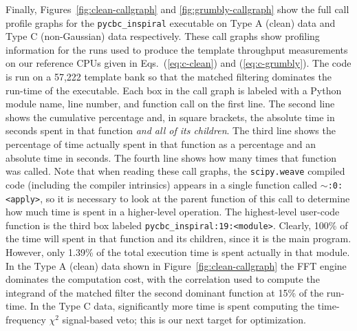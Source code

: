 Finally, Figures~\ref{fig:clean-callgraph} and \ref{fig:grumbly-callgraph}
show the full call profile graphs for the \texttt{pycbc\_inspiral} executable
on Type A (clean) data and Type C (non-Gaussian) data respectively. These call
graphs show profiling information for the runs used to produce the template
throughput measurements on our reference CPUs given in Eqs.~(\ref{eq:c-clean})
and (\ref{eq:c-grumbly}). The code is run on a 57,222 template bank 
so that the matched filtering dominates the run-time
of the executable.
Each box in the call graph is labeled with a Python module name, line number,
and function call on the first line. The second line shows the cumulative
percentage and, in square brackets, the absolute time in seconds spent in that
function \emph{and all of its children}. The third line shows the percentage
of time actually spent in that function as a percentage and an absolute time
in seconds. The fourth line shows how many times that function was called.
Note that when reading these call graphs, the \texttt{scipy.weave} compiled
code (including the compiler intrinsics) appears in a single function called
\texttt{$\sim$:0:<apply>}, so it is necessary to look at the parent function of
this call to determine how much time is spent in a higher-level operation.
The highest-level user-code function is the third box labeled
\texttt{pycbc\_inspiral:19:<module>}.  Clearly, 100\% of the time will spent
in that function and its children, since it is the main program. However, only
1.39\% of the total execution time is spent actually in that module. In the
Type A (clean) data shown in Figure~\ref{fig:clean-callgraph} the FFT engine
dominates the computation cost, with the correlation used to compute the
integrand of the matched filter the second dominant function at 15\% of the
run-time. In the Type C data, significantly more time is spent computing the
time-frequency $\chi^2$ signal-based veto; this is our next target for 
optimization. 

\noindent\makebox[\linewidth]{\rule{\textwidth}{1pt}} 



